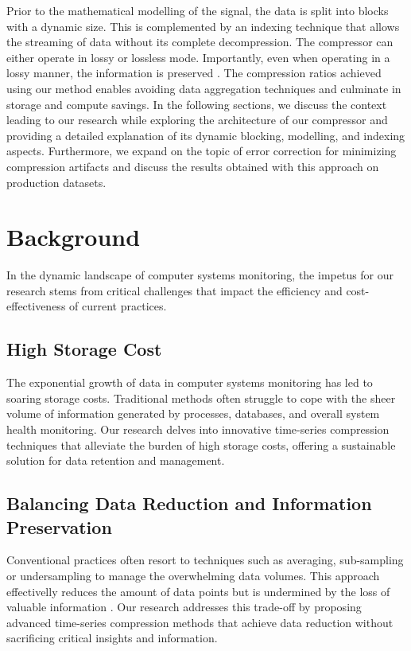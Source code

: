 \documentclass[conference]{IEEEtran}
\begin{document}
Prior to the mathematical modelling of the signal, the data is split into blocks with a dynamic size.
This is complemented by an indexing technique that allows the streaming of data without its complete decompression.
The compressor can either operate in lossy or lossless mode. Importantly, even when operating in a lossy manner, the information is preserved  .
The compression ratios achieved using our method enables avoiding data aggregation techniques and culminate in storage and compute savings.
In the following sections, we discuss the context leading to our research while exploring the architecture of our compressor and providing a detailed explanation of its dynamic blocking, modelling, and indexing aspects. Furthermore, we expand on the topic of error correction for minimizing compression artifacts and discuss the results obtained with this approach on production datasets.

\section{Background}

In the dynamic landscape of computer systems monitoring, the impetus for our research stems from critical challenges that impact the efficiency and cost-effectiveness of current practices. 

\subsection{High Storage Cost}

The exponential growth of data in computer systems monitoring has led to soaring storage costs. Traditional methods often struggle to cope with the sheer volume of information generated by processes, databases, and overall system health monitoring. Our research delves into innovative time-series compression techniques that alleviate the burden of high storage costs, offering a sustainable solution for data retention and management. 

\subsection{Balancing Data Reduction and Information Preservation}
Conventional practices often resort to techniques such as averaging, sub-sampling or undersampling to manage the overwhelming data volumes. This approach effectivelly reduces the amount of data points but is undermined by the loss of valuable information . Our research addresses this trade-off by proposing advanced time-series compression methods that achieve data reduction without sacrificing critical insights and information. 
\end{document}
